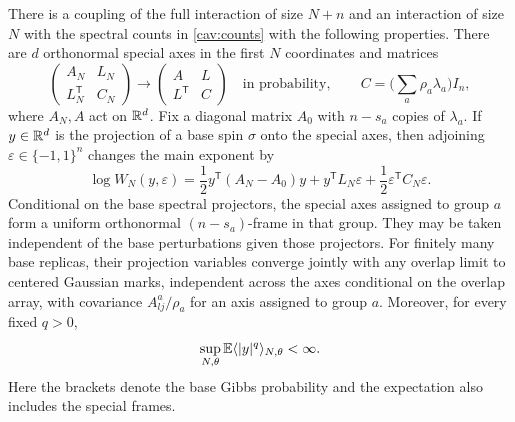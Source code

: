 \begin{lemma}\label{cav:coupling}
There is a coupling of the full interaction of size $N+n$ and an
interaction of size $N$ with the spectral counts in \eqref{cav:counts}
with the following properties.  There are $d$ orthonormal special axes
in the first $N$ coordinates and matrices
\begin{equation}\label{cav:blocks}
 \begin{pmatrix}A_N&L_N\\L_N^{\mathsf T}&C_N\end{pmatrix}
 \longrightarrow
 \begin{pmatrix}A&L\\L^{\mathsf T}&C\end{pmatrix}
 \quad\text{in probability},
 \qquad C=\Big(\sum_a\rho_a\lambda_a\Big)I_n,
\end{equation}
where $A_N,A$ act on $\mathbb R^d$.  Fix a diagonal matrix $A_0$ with
$n-s_a$ copies of $\lambda_a$.  If $y\in\mathbb R^d$ is the projection of a
base spin $\sigma$ onto the special axes, then adjoining
$\varepsilon\in\{-1,1\}^n$ changes the main exponent by
\begin{equation}\label{cav:factor}
 \log W_N(y,\varepsilon)
 =\frac12y^{\mathsf T}(A_N-A_0)y
   +y^{\mathsf T}L_N\varepsilon
   +\frac12\varepsilon^{\mathsf T}C_N\varepsilon.
\end{equation}
Conditional on the base spectral projectors, the special axes assigned
to group $a$ form a uniform orthonormal $(n-s_a)$-frame in that group.
They may be taken independent of the base perturbations given those
projectors.  For finitely many base replicas, their projection variables
converge jointly with any overlap limit to centered Gaussian marks,
independent across the axes conditional on the overlap array, with
covariance $A^a_{lj}/\rho_a$ for an axis assigned to group $a$.
Moreover, for every fixed $q>0$,
\begin{equation}\label{cav:base-moments}
 \sup_{N,\theta}\mathbb E\langle |y|^q\rangle_{N,\theta}<\infty.
\end{equation}
Here the brackets denote the base Gibbs probability and the expectation
also includes the special frames.
\end{lemma}

